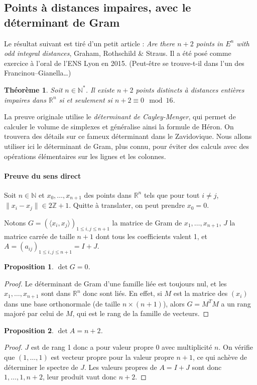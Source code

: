 \documentclass[a4paper, 11pt]{article}
\def\Z{\mathbb{Z}}
\def\N{\mathbb{N}}
\def\R{\mathbb{R}}
\newtheorem*{proposition}{Proposition}
\newtheorem*{theorem}{Théorème}
\begin{document}
\subsection{Points à distances impaires, avec le déterminant de Gram}
\label{gram}

Le résultat suivant est tiré d'un petit article : \emph{Are there $n+2$ points
  in $E^n$ with odd integral distances}, Graham, Rothschild \& Straus. Il a été
posé comme exercice à l'oral de l'ENS Lyon en 2015. (Peut-être se trouve-t-il
dans l'un des Francinou--Gianella…)
\begin{theorem}
  Soit $n \in \N^*$. Il existe $n+2$ points distincts à distances entières
  impaires dans $\R^n$ si et seulement si $n+2 \equiv 0 \mod 16$.
\end{theorem}

La preuve originale utilise le \emph{déterminant de Cayley-Menger}, qui permet
de calculer le volume de simplexes et généralise ainsi la formule de Héron. On
trouvera des détails sur ce fameux déterminant dans le Zavidovique. Nous allons
utiliser ici le déterminant de Gram, plus connu, pour éviter des calculs avec
des opérations élémentaires sur les lignes et les colonnes.

\paragraph{Preuve du sens direct}

Soit $n \in \N$ et $x_0, \ldots, x_{n+1}$ des points dans $\R^n$ tels que pour
tout $i \neq j$, $\|x_i - x_j\| \in 2\Z + 1$. Quitte à translater, on peut
prendre $x_0 = 0$.

Notons $G = (\langle x_i, x_j \rangle)_{1 \leq i,j \leq n+1}$ la matrice de Gram
de $x_1, \ldots, x_{n+1}$, $J$ la matrice carrée de taille $n+1$ dont tous les
coefficients valent 1, et $A = (a_{ij})_{1 \leq i,j \leq n+1} = I+J$.

\begin{proposition}
  $\det G = 0$.
\end{proposition}
\begin{proof}
  Le déterminant de Gram d'une famille liée est toujours nul, et les $x_1,
  \ldots, x_{n+1}$ sont dans $\R^n$ donc sont liés. En effet, si $M$ est la
  matrice des $(x_i)$ dans une base orthonormale (de taille $n \times (n+1)$),
  alors $G = M^T M$ a un rang majoré par celui de $M$, qui est le rang de la
  famille de vecteurs.
\end{proof}

\begin{proposition}
  $\det A = n+2$.
\end{proposition}
\begin{proof}
  $J$ est de rang 1 donc a pour valeur propre 0 avec multiplicité $n$. On
  vérifie que $(1,\ldots,1)$ est vecteur propre pour la valeur propre $n+1$, ce
  qui achève de déterminer le spectre de $J$. Les valeurs propres de $A = I+J$
  sont donc $1, \ldots, 1, n+2$, leur produit vaut donc $n+2$.
\end{proof}
\end{document}
